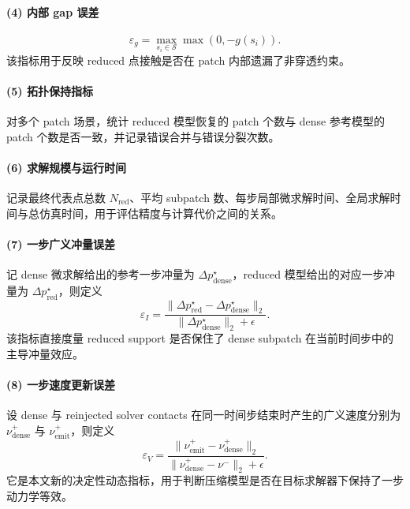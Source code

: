\paragraph{(4) 内部 gap 误差}
\begin{equation}
\varepsilon_g = \max_{s_i\in\mathcal{S}} \max(0,-g(s_i)).
\end{equation}
该指标用于反映 reduced 点接触是否在 patch 内部遗漏了非穿透约束。

\paragraph{(5) 拓扑保持指标}
对多个 patch 场景，统计 reduced 模型恢复的 patch 个数与 dense 参考模型的 patch 个数是否一致，并记录错误合并与错误分裂次数。

\paragraph{(6) 求解规模与运行时间}
记录最终代表点总数 $N_{\mathrm{red}}$、平均 subpatch 数、每步局部微求解时间、全局求解时间与总仿真时间，用于评估精度与计算代价之间的关系。

\paragraph{(7) 一步广义冲量误差}
记 dense 微求解给出的参考一步冲量为 $\Delta p_{\mathrm{dense}}^\star$，reduced 模型给出的对应一步冲量为 $\Delta p_{\mathrm{red}}^\star$，则定义
\begin{equation}
\varepsilon_I
=
\frac{\|\Delta p_{\mathrm{red}}^\star-\Delta p_{\mathrm{dense}}^\star\|_2}
{\|\Delta p_{\mathrm{dense}}^\star\|_2+\epsilon}.
\end{equation}
该指标直接度量 reduced support 是否保住了 dense subpatch 在当前时间步中的主导冲量效应。

\paragraph{(8) 一步速度更新误差}
设 dense 与 reinjected solver contacts 在同一时间步结束时产生的广义速度分别为 $\nu_{\mathrm{dense}}^{+}$ 与 $\nu_{\mathrm{emit}}^{+}$，则定义
\begin{equation}
\varepsilon_V
=
\frac{\|\nu_{\mathrm{emit}}^{+}-\nu_{\mathrm{dense}}^{+}\|_2}
{\|\nu_{\mathrm{dense}}^{+}-\nu^{-}\|_2+\epsilon}.
\end{equation}
它是本文新的决定性动态指标，用于判断压缩模型是否在目标求解器下保持了一步动力学等效。

